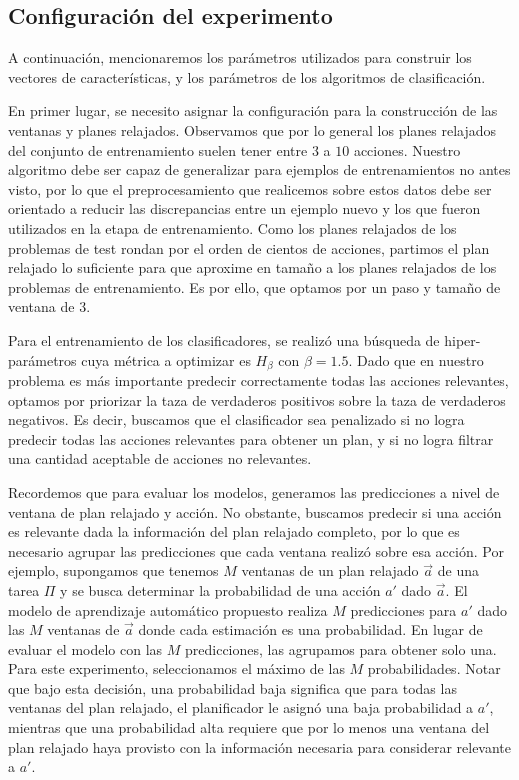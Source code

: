 \subsection{Configuración del experimento}

A continuación, mencionaremos los parámetros utilizados para construir los
vectores de características, y los parámetros de los algoritmos de
clasificación.

En primer lugar, se necesito asignar la configuración para la construcción de las ventanas y planes relajados.  Observamos que
por lo general los planes relajados del conjunto de entrenamiento suelen tener
entre $3$ a $10$ acciones. Nuestro algoritmo debe ser capaz de generalizar para
ejemplos de entrenamientos no antes visto, por lo que el preprocesamiento que
realicemos sobre estos datos debe ser orientado a reducir las discrepancias
entre un ejemplo nuevo y los que fueron utilizados en la etapa de entrenamiento.
Como los planes relajados de los problemas de test rondan por el orden de
cientos de acciones, partimos el plan relajado lo suficiente para que aproxime
en tamaño a los planes relajados de los problemas de entrenamiento. Es por ello, que optamos por un paso y tamaño de ventana de $3$.

Para el entrenamiento de los clasificadores, se realizó una búsqueda de
hiper-parámetros cuya métrica a optimizar es $H_{\beta}$ con $\beta = 1.5$. Dado
que en nuestro problema es más importante predecir correctamente todas las
acciones relevantes, optamos por priorizar la taza de verdaderos positivos sobre
la taza de verdaderos negativos. Es decir, buscamos que el clasificador sea
penalizado si no logra predecir todas las acciones relevantes para obtener un
plan, y si no logra filtrar una cantidad aceptable de acciones no relevantes.

Recordemos que para evaluar los modelos, generamos las predicciones a nivel de
ventana de plan relajado y acción. No obstante, buscamos predecir si una acción
es relevante dada la información del plan relajado completo, por lo que es
necesario agrupar las predicciones que cada ventana realizó sobre esa acción.
Por ejemplo, supongamos que tenemos $M$ ventanas de un plan relajado $\vec{a}$
de una tarea $\Pi$ y se busca determinar la probabilidad de una acción $a'$ dado
$\vec{a}$. El modelo de aprendizaje automático propuesto realiza $M$
predicciones para $a'$ dado las $M$ ventanas de $\vec{a}$ donde cada estimación
es una probabilidad. En lugar de evaluar el modelo con las $M$ predicciones, las
agrupamos para obtener solo una. Para este experimento, seleccionamos el máximo
de las $M$ probabilidades. Notar que bajo esta decisión, una probabilidad baja
significa que para todas las ventanas del plan relajado, el planificador le
asignó una baja probabilidad a $a'$, mientras que una probabilidad alta requiere
que por lo menos una ventana del plan relajado haya provisto con la información
necesaria para considerar relevante a $a'$.

